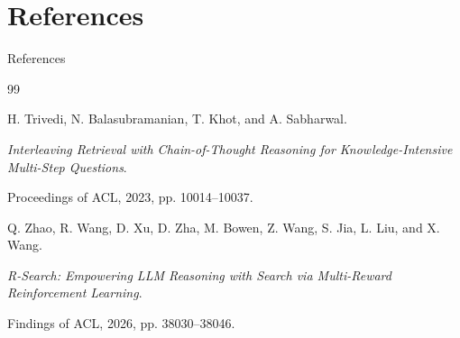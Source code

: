 
\section{References}

\begin{frame}{References}

\footnotesize

\begin{thebibliography}{99}

H. Trivedi, N. Balasubramanian, T. Khot, and A. Sabharwal.

\textit{Interleaving Retrieval with Chain-of-Thought Reasoning
for Knowledge-Intensive Multi-Step Questions}.

Proceedings of ACL, 2023, pp. 10014--10037.

\vspace{0.3cm}

Q. Zhao, R. Wang, D. Xu, D. Zha, M. Bowen, Z. Wang,
S. Jia, L. Liu, and X. Wang.

\textit{R-Search: Empowering LLM Reasoning with Search
via Multi-Reward Reinforcement Learning}.

Findings of ACL, 2026, pp. 38030--38046.

\end{thebibliography}

\end{frame}
